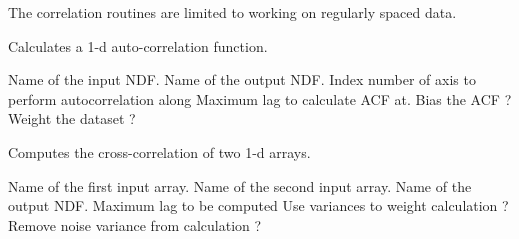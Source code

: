 The correlation routines are limited to working on regularly spaced
data.


\begin{manroutinedescription}

Calculates a 1-d auto-correlation function.

\begin{manparametertable}
   Name of the input NDF.
   Name of the output NDF.
   Index number of axis to perform autocorrelation along
   Maximum lag to calculate ACF at.
   Bias the ACF ?
   Weight the dataset ?
\end{manparametertable}

\end{manroutinedescription}


\begin{manroutinedescription}

Computes the cross-correlation of two 1-d arrays. 

\begin{manparametertable}
   Name of the first input array.
   Name of the second input array.
   Name of the output NDF.
   Maximum lag to be computed
   Use variances to weight calculation ?
   Remove noise variance from calculation ?
\end{manparametertable}

\end{manroutinedescription}

